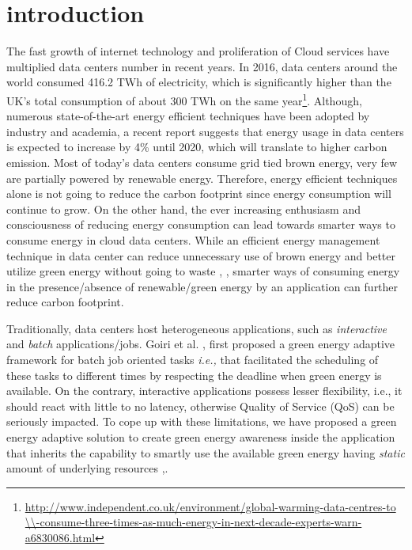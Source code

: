 \section{introduction}


The fast growth of internet technology and proliferation of Cloud services have multiplied data centers number in recent years. In 2016, data centers around the world consumed 416.2 TWh of electricity, which is significantly higher than the UK's total consumption of about 300 TWh on the same year\footnote{\url{http://www.independent.co.uk/environment/global-warming-data-centres-to \\-consume-three-times-as-much-energy-in-next-decade-experts-warn-a6830086.html}}. Although, numerous state-of-the-art energy efficient techniques have been adopted by industry and academia, a recent report suggests that energy usage in data centers is expected to increase by 4\% until 2020, which will translate to higher carbon emission. Most of today's data centers consume grid tied brown energy, very few are partially powered by renewable energy. Therefore, energy efficient techniques alone is not going to reduce the
carbon footprint since energy consumption will continue to grow.
On the other hand, the ever increasing enthusiasm and consciousness of reducing energy consumption can lead towards smarter ways to consume energy in cloud data centers. While an efficient energy management technique in data center can reduce unnecessary use of brown energy and better utilize green energy without going to waste \cite{parasol}, \cite{sabbir}, smarter ways of consuming energy in the presence/absence of renewable/green energy by an application can further reduce carbon footprint.

 

Traditionally, data centers host heterogeneous applications, such as \emph{interactive} and \emph{batch} applications/jobs. Goiri et al. \cite{GreenSlot}, \cite{GreenHadoop} first proposed a green energy adaptive framework for batch job oriented tasks \emph{i.e.,} that facilitated the scheduling of these tasks to different times by respecting the deadline when green energy is available. On the contrary, interactive
applications possess lesser flexibility, i.e., it should react with
little to no latency, otherwise Quality of Service (QoS) can
be seriously impacted. To cope up with these limitations, we have proposed a green energy adaptive solution to create green energy awareness inside the application that inherits the capability to smartly use the available green energy having \emph{static} amount of underlying resources \cite{cloudcom},\cite{tsc}.


